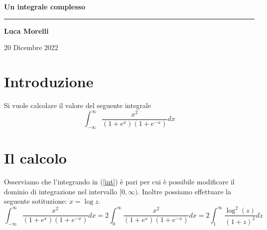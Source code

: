 \begin{center}
	\huge \textbf{Un integrale complesso}
	
	\rule{7cm}{0.4pt} 
	
	\LARGE 
	
	\vspace{10pt}
	
	\LARGE \textbf{Luca Morelli}
	
	\vspace{5pt}
	
	\LARGE 20 Dicembre 2022
	
\end{center}

\vspace{20pt}




	\section{Introduzione}
	Si vuole calcolare il valore del seguente integrale
	\begin{equation}
		\int_{-\infty}^{\infty} \frac{x^2}{(1+e^x)(1+e^{-x})}dx
		\label{int}
	\end{equation}
    \section{Il calcolo}
	Osserviamo che l'integrando in (\ref{int}) è pari per cui è possibile 
	modificare il dominio di integrazione nel intervallo $[0,\infty)$. Inoltre 
	possiamo effettuare la seguente sotituzione: $x=\log z$.
	\begin{equation*}
		\int_{-\infty}^{\infty} \frac{x^2}{(1+e^x)(1+e^{-x})}dx=2\int_{0}^{\infty} \frac{x^2}{(1+e^x)(1+e^{-x})}dx=
		2\int_{1}^{\infty} \frac{\log^2(z)}{(1+z)^2}dz
	\end{equation*}
	
